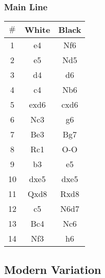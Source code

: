 \documentclass{article}
\newcommand{\smalls}{\par\smallskip}
\begin{document}
        \subsubsection*{Main Line}
        \newgame
        \begin{multicols}{2}
            \showboard
            \smalls
            \begin{tabular}{c|c|c}
            $\#$ & White & Black\\
            \hline
            1 & e4 & Nf6 \\
            2 & e5 & Nd5 \\
            3 & d4 & d6 \\
            4 & c4 & Nb6 \\
            5 & exd6 & cxd6 \\
            6 & Nc3 & g6 \\
            7 & Be3 & Bg7 \\
            8 & Rc1 & O-O \\
            9 & b3 & e5 \\
            10 & dxe5 & dxe5 \\
            11 & Qxd8 & Rxd8 \\
            12 & c5 & N6d7 \\
            13 & Bc4 & Nc6 \\
            14 & Nf3 & h6 \\
        \end{tabular}
        \end{multicols}

        \subsection*{Modern Variation}
\end{document}
